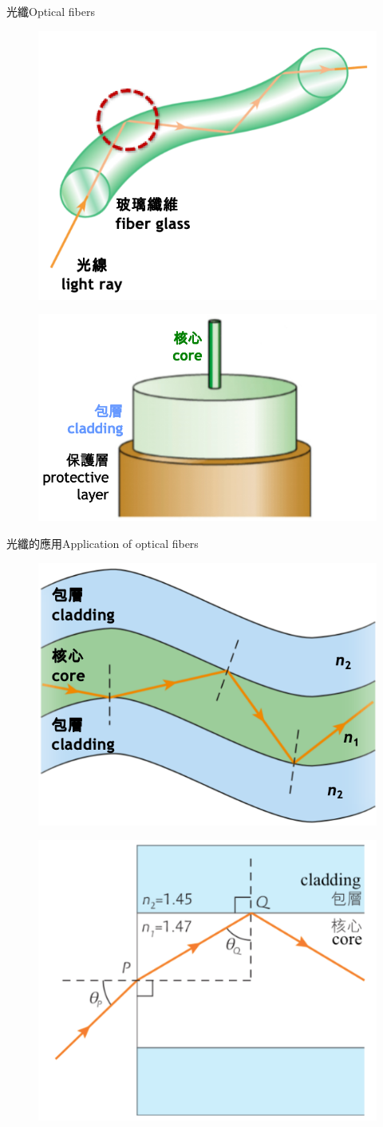 \documentclass[beamer=true]{standalone}
\begin{document}
\begin{frame}{光纖Optical fibers}
\begin{figure}
    \centering
    \includegraphics[width=0.4\linewidth]{assets/dj893d8239823age.png}
    
    
\end{figure}
    \begin{figure}
        \centering
        \includegraphics[width=0.4\linewidth]{assets/ddj32e.png}
        
        
    \end{figure}
\end{frame}




\begin{frame}{光纖的應用Application of optical fibers}
    \begin{figure}
    \centering
    \includegraphics[width=0.4\linewidth]{assets/32e23d234f5.png}
\end{figure}
\begin{figure}
    \centering
    \includegraphics[width=0.4\linewidth]{assets/djnu349bd9843fge.png}
\end{figure}
\end{frame}
\end{document}
